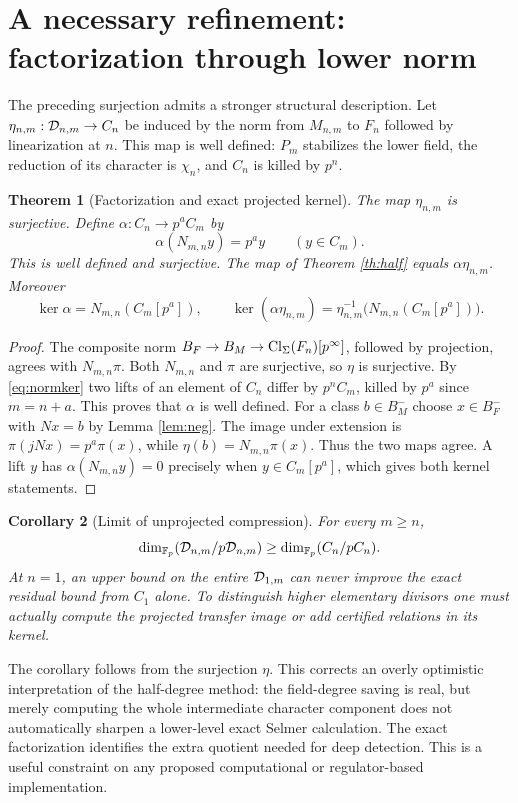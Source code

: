 \documentclass[11pt,a4paper]{article}
\newtheorem{theorem}{Theorem}[section]
\newtheorem{corollary}[theorem]{Corollary}
\theoremstyle{definition}\newtheorem{definition}[theorem]{Definition}
\theoremstyle{remark}\newtheorem{remark}[theorem]{Remark}
\numberwithin{equation}{section}
\begin{document}
\section{A necessary refinement: factorization through lower norm}
The preceding surjection admits a stronger structural description. Let $\eta_{n,m}:\mathcal D_{n,m}\to C_n$ be induced by the norm from $M_{n,m}$ to $F_n$ followed by linearization at $n$. This map is well defined: $P_m$ stabilizes the lower field, the reduction of its character is $\chi_n$, and $C_n$ is killed by $p^n$.

\begin{theorem}[Factorization and exact projected kernel]\label{th:factor}
The map $\eta_{n,m}$ is surjective. Define $\alpha:C_n\to p^aC_m$ by
\[
\alpha(N_{m,n}y)=p^ay\qquad(y\in C_m).
\]
This is well defined and surjective. The map of Theorem \ref{th:half} equals $\alpha\eta_{n,m}$. Moreover
\begin{equation}\label{eq:factorker}
\ker\alpha=N_{m,n}(C_m[p^a]),\qquad
\ker(\alpha\eta_{n,m})=\eta_{n,m}^{-1}\bigl(N_{m,n}(C_m[p^a])\bigr).
\end{equation}
\end{theorem}
\begin{proof}
The composite norm $B_F\to B_M\to\operatorname{Cl}_\Sigma(F_n)[p^\infty]$, followed by projection, agrees with $N_{m,n}\pi$. Both $N_{m,n}$ and $\pi$ are surjective, so $\eta$ is surjective. By \eqref{eq:normker} two lifts of an element of $C_n$ differ by $p^nC_m$, killed by $p^a$ since $m=n+a$. This proves that $\alpha$ is well defined. For a class $b\in B_M^-$ choose $x\in B_F^-$ with $Nx=b$ by Lemma \ref{lem:neg}. The image under extension is $\pi(jNx)=p^a\pi(x)$, while $\eta(b)=N_{m,n}\pi(x)$. Thus the two maps agree. A lift $y$ has $\alpha(N_{m,n}y)=0$ precisely when $y\in C_m[p^a]$, which gives both kernel statements.\end{proof}

\begin{corollary}[Limit of unprojected compression]\label{cor:limit}
For every $m\ge n$,
\[
\dim_{\mathbb F_p}(\mathcal D_{n,m}/p\mathcal D_{n,m})\ge\dim_{\mathbb F_p}(C_n/pC_n).
\]
At $n=1$, an upper bound on the entire $\mathcal D_{1,m}$ can never improve the exact residual bound from $C_1$ alone. To distinguish higher elementary divisors one must actually compute the projected transfer image or add certified relations in its kernel.
\end{corollary}
The corollary follows from the surjection $\eta$. This corrects an overly optimistic interpretation of the half-degree method: the field-degree saving is real, but merely computing the whole intermediate character component does not automatically sharpen a lower-level exact Selmer calculation. The exact factorization identifies the extra quotient needed for deep detection. This is a useful constraint on any proposed computational or regulator-based implementation.
\end{document}
